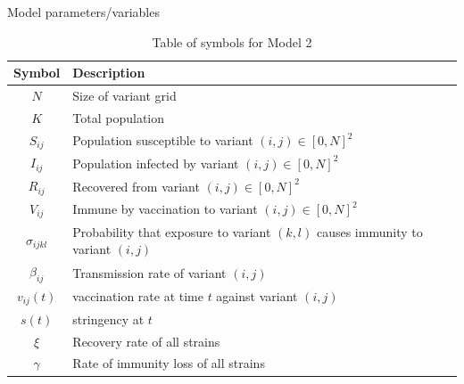 \documentclass{beamer}
\begin{document}
\begin{frame}{Model parameters/variables}
    \begin{table}[h!]
        \begin{center}
        \begin{tabular}{c|p{8cm}}
                Symbol & Description\\
                \hline
                \hline
                $N$ & Size of variant grid \\
                $K$ & Total population \\
                $S_{ij}$ & Population susceptible to variant $(i,j) \in [0,N]^2$ \\
                $I_{ij}$ & Population infected by variant $(i,j) \in [0,N]^2$\\
                $R_{ij}$ & Recovered from variant $(i,j) \in [0,N]^2$\\
                $V_{ij}$ & Immune by vaccination to variant $(i,j) \in [0,N]^2$\\
                $\sigma_{ijkl}$ & Probability that exposure to variant $(k,l)$ causes immunity \newline to variant $(i,j)$\\
                $\beta_{ij}$ & Transmission rate of variant $(i,j)$\\
                $v_{ij}(t)$ & vaccination rate at time $t$ against variant $(i,j)$\\
                $s(t)$ & stringency at $t$\\
                $\xi$ & Recovery rate of all strains \\
                $\gamma$ & Rate of immunity loss of all strains \\
        \end{tabular}
        \caption{Table of symbols for Model 2}
    
        \label{variables_2}
        \end{center}
    \end{table}
\end{frame}
\end{document}
